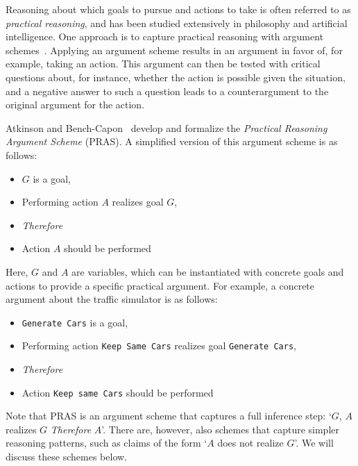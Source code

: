 Reasoning about which goals to pursue and actions to take is often referred to as \emph{practical reasoning}, and has been studied extensively in philosophy and artificial intelligence. One approach is to capture practical reasoning with argument schemes~\cite{walton1990}. Applying an argument scheme results in an argument in favor of, for example, taking an action. This argument can then be tested with critical questions about, for instance, whether the action is possible given the situation, and a negative answer to such a question leads to a counterargument to the original argument for the action. 

Atkinson and Bench-Capon~\cite{atkinson2007} develop and formalize the \emph{Practical Reasoning Argument Scheme} (PRAS). A simplified version of this argument scheme is as follows:

\begin{itemize}
\item[] $G$ is a goal,
\item[] Performing action $A$ realizes goal $G$,
\item[] \textit{Therefore} 
\item[] Action $A$ should be performed
\end{itemize}

Here, $G$ and $A$ are variables, which can be instantiated with concrete goals and actions to provide a specific practical argument. For example, a concrete argument about the traffic simulator is as follows: 
\begin{itemize}
\item[] \texttt{Generate Cars} is a goal,
\item[] Performing action \texttt{Keep Same Cars} realizes goal \texttt{Generate Cars}, 
\item[] \textit{Therefore} 
\item[] Action \texttt{Keep same Cars} should be performed
\end{itemize}

Note that PRAS is an argument scheme that captures a full inference step: `$G$, $A$ realizes $G$ \emph{Therefore} $A$'. There are, however, also schemes that capture simpler reasoning patterns, such as claims of the form `$A$ does not realize $G$'. We will discuss these schemes below. 

